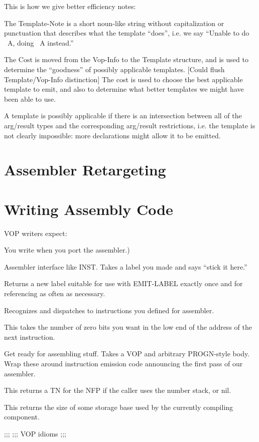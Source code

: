This is how we give better efficiency notes:

The Template-Note is a short noun-like string without capitalization or
punctuation that describes what the template ``does'', i.e. we say
``Unable to do ~A, doing ~A instead.''

The Cost is moved from the Vop-Info to the Template structure, and is used to
determine the ``goodness'' of possibly applicable templates.  [Could flush
Template/Vop-Info distinction]  The cost is used to choose the best applicable
template to emit, and also to determine what better templates we might have
been able to use.

A template is possibly applicable if there is an intersection between all of
the arg/result types and the corresponding arg/result restrictions, i.e. the
template is not clearly impossible: more declarations might allow it to be
emitted.

\chapter{Assembler Retargeting}

\chapter{Writing Assembly Code}

VOP writers expect:
\begin{Lentry}
\item[MOVE]
      You write when you port the assembler.)
\item[EMIT-LABEL]
      Assembler interface like INST.  Takes a label you made and says ``stick it
      here.''
   \item[GEN-LABEL]
      Returns a new label suitable for use with EMIT-LABEL exactly once and
      for referencing as often as necessary.
   \item[INST]
      Recognizes and dispatches to instructions you defined for assembler.
   \item[ALIGN]
      This takes the number of zero bits you want in the low end of the address
      of the next instruction.
   \item[ASSEMBLE]
   \item[ASSEMBLE-ELSEWHERE]
      Get ready for assembling stuff.  Takes a VOP and arbitrary PROGN-style
      body.  Wrap these around instruction emission code announcing the first
      pass of our assembler.
   \item[CURRENT-NFP-TN]
      This returns a TN for the NFP if the caller uses the number stack, or
      nil.
   \item[SB-ALLOCATED-SIZE]
      This returns the size of some storage base used by the currently
      compiling component.
   \item[...]
\end{Lentry}
;;;
;;; VOP idioms
;;;

